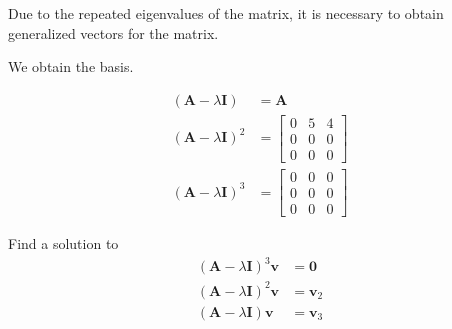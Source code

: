 \begin{itemize}
 Due to the repeated eigenvalues of the matrix, it is necessary
 to obtain generalized vectors for the matrix.

We obtain the basis.

\begin{align*}
 (\mathbf{A}-\lambda\mathbf{I}) &= \mathbf{A}\\
 (\mathbf{A}-\lambda\mathbf{I})^2 &= \begin{bmatrix}
                                      0 & 5 & 4\\
                                      0 & 0 & 0\\
                                      0 & 0 & 0
                                     \end{bmatrix}
\\
 (\mathbf{A}-\lambda\mathbf{I})^3 &= \begin{bmatrix}
                                      0 & 0 & 0\\
                                      0 & 0 & 0\\
                                      0 & 0 & 0
                                     \end{bmatrix}
\end{align*}

Find a solution to
\begin{align*}
(\mathbf{A}-\lambda \mathbf{I})^3 \mathbf{v}& = \mathbf{0} \\
(\mathbf{A}-\lambda \mathbf{I})^2 \mathbf{v}& = \mathbf{v}_2 \\
(\mathbf{A}-\lambda \mathbf{I}) \mathbf{v}& = \mathbf{v}_3 \\
\end{align*}


\end{itemize}
